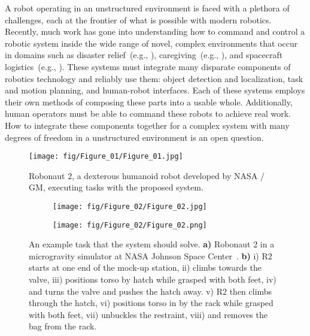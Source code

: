 A robot operating in an unstructured environment is faced with a plethora of challenges, each at the frontier of what is possible with modern robotics.
Recently, much work has gone into understanding how to command and control a robotic system inside the wide range of novel, complex environments that occur in domains such as disaster relief~(e.g., \cite{Johnson2015}), caregiving~(e.g., \cite{FISCHINGER201660}), and spacecraft logistics~(e.g., \cite{Baker2017}).
These systems must integrate many disparate components of robotics technology and reliably use them: object detection and localization, task and motion planning, and human-robot interfaces.
Each of these systems employs their own methods of composing these parts into a usable whole.
Additionally, human operators must be able to command these robots to achieve real work.
How to integrate these components together for a complex system with many degrees of freedom in a unstructured environment is an open question.

\begin{figure}
  \centering
  \texttt{[image: fig/Figure\_01/Figure\_01.jpg]}
  \caption[Robonaut 2 Executing Various Tasks] {
    \label{fig:r2_tasks}
    Robonaut 2, a dexterous humanoid robot developed by NASA / GM, executing tasks with the proposed system.
  }
\end{figure}

\begin{figure*}
  \centering
  \begin{subfigure}[t]{0.35\textwidth}
    \texttt{[image: fig/Figure\_02/Figure\_02.jpg]}
    \caption[Robonaut 2 in Mock-Up Space Station]{
      \label{fig:scenario_real}
    }
  \end{subfigure}%
  \begin{subfigure}[t]{0.6\textwidth}
    \texttt{[image: fig/Figure\_02/Figure\_02.png]}
    \caption[Breakdown of Task at Hand]{
      \label{fig:scenario_drawing}
    }
  \end{subfigure}
  \caption[Archetypal Scenario for the System] {
    \label{fig:scenario}
    An example task that the system should solve.
    \textbf{a)} Robonaut 2 in a microgravity simulator at NASA Johnson Space Center~\cite{Valle2011}.
    \textbf{b)}
    i) R2 starts at one end of the mock-up station,
    ii) climbs towards the valve,
    iii) positions torso by hatch while grasped with both feet,
    iv) and turns the valve and pushes the hatch away.
    v) R2 then climbs through the hatch,
    vi) positions torso in by the rack while grasped with both feet,
    vii) unbuckles the restraint,
    viii) and removes the bag from the rack.
  }
\end{figure*}

